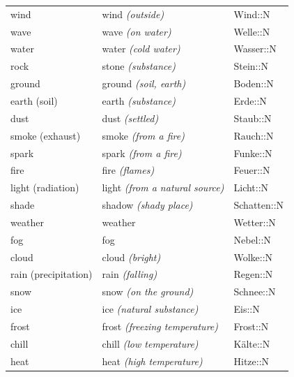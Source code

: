 \begin{center}
\begin{longtable}{lll}
{\sc \lowercase{	WIND	}}	&	wind	\textit{\footnotesize (outside)}	&	Wind::N	\\
{\sc \lowercase{	WAVE	}}	&	wave	\textit{\footnotesize (on water)}	&	Welle::N	\\
{\sc \lowercase{	WATER	}}	&	water	\textit{\footnotesize (cold water)}	&	Wasser::N	\\
{\sc \lowercase{	ROCK	}}	&	stone	\textit{\footnotesize (substance)}	&	Stein::N	\\
{\sc \lowercase{	GROUND	}}	&	ground	\textit{\footnotesize (soil, earth)}	&	Boden::N	\\
{\sc \lowercase{	EARTH \footnotesize (SOIL)	}}	&	earth	\textit{\footnotesize (substance)}	&	Erde::N	\\
{\sc \lowercase{	DUST	}}	&	dust	\textit{\footnotesize (settled)}	&	Staub::N	\\
{\sc \lowercase{	SMOKE \footnotesize (EXHAUST)	}}	&	smoke	\textit{\footnotesize (from a fire)}	&	Rauch::N	\\
{\sc \lowercase{	SPARK	}}	&	spark	\textit{\footnotesize (from a fire)}	&	Funke::N	\\
{\sc \lowercase{	FIRE	}}	&	fire	\textit{\footnotesize (flames)}	&	Feuer::N	\\
{\sc \lowercase{	LIGHT \footnotesize (RADIATION)	}}	&	light	\textit{\footnotesize (from a natural source)}	&	Licht::N	\\
{\sc \lowercase{	SHADE	}}	&	shadow	\textit{\footnotesize (shady place)}	&	Schatten::N	\\
{\sc \lowercase{	WEATHER	}}	&	weather		&	Wetter::N	\\
{\sc \lowercase{	FOG	}}	&	fog		&	Nebel::N	\\
{\sc \lowercase{	CLOUD	}}	&	cloud	\textit{\footnotesize (bright)}	&	Wolke::N	\\
{\sc \lowercase{	RAIN \footnotesize (PRECIPITATION)	}}	&	rain	\textit{\footnotesize (falling)}	&	Regen::N	\\
{\sc \lowercase{	SNOW	}}	&	snow	\textit{\footnotesize (on the ground)}	&	Schnee::N	\\
{\sc \lowercase{	ICE	}}	&	ice	\textit{\footnotesize (natural substance)}	&	Eis::N	\\
{\sc \lowercase{	FROST	}}	&	frost	\textit{\footnotesize (freezing temperature)}	&	Frost::N	\\
{\sc \lowercase{	CHILL	}}	&	chill	\textit{\footnotesize (low temperature)}	&	Kälte::N	\\
{\sc \lowercase{	HEAT	}}	&	heat	\textit{\footnotesize (high temperature)}	&	Hitze::N	\\

\end{longtable}
\end{center}
